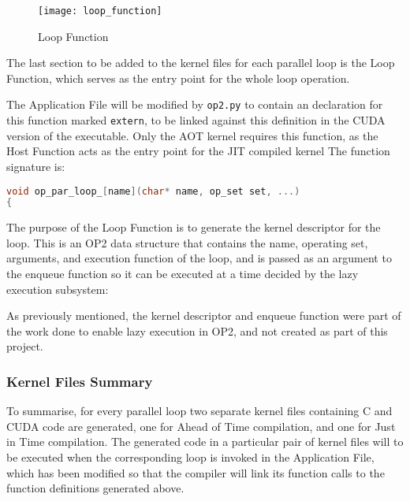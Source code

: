 \clearpage

\begin{wrapfigure}{r}{.33\textwidth}
  \centering
  \caption{Loop Function}
  \label{fig:loop_func}
  \texttt{[image: loop\_function]}
\end{wrapfigure}
The last section to be added to the kernel files for each parallel loop is the Loop Function, which serves as the entry point for the whole loop operation.
 \par
The Application File will be modified by \verb|op2.py| to contain an declaration for this function marked \verb|extern|, to be linked against this definition in the CUDA version of the executable. Only the AOT kernel requires this function, as the Host Function acts as the entry point for the JIT compiled kernel The function signature is:
\begin{lstlisting}[backgroundcolor=\color{blue!20}, language=C]
void op_par_loop_[name](char* name, op_set set, ...)
{

\end{lstlisting}
\par
\noindent The purpose of the Loop Function is to generate the kernel descriptor for the loop. This is an OP2 data structure that contains the name, operating set, arguments, and execution function of the loop, and is passed as an argument to the enqueue function so it can be executed at a time decided by the lazy execution subsystem:

\noindent As previously mentioned, the kernel descriptor and enqueue function were part of the work done to enable lazy execution in OP2, and not created as part of this project.

\clearpage

\subsubsection{Kernel Files Summary}
\label{impl_summary}

To summarise, for every parallel loop two separate kernel files containing C and CUDA code are generated, one for Ahead of Time compilation, and one for Just in Time compilation. The generated code in a particular pair of kernel files will to be executed when the corresponding loop is invoked in the Application File, which has been modified so that the compiler will link its function calls to the function definitions generated above.

